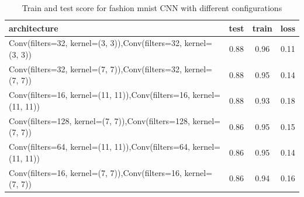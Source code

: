 \documentclass[10pt]{SelfArx} %
\begin{document}
\begin{table}[]
	\begin{tabular*}{1\linewidth}{@{\extracolsep{\fill} }lccc@{}}
		\toprule
		architecture & test & train & loss \\ \midrule
		Conv(filters=32, kernel=(3, 3)),Conv(filters=32, kernel=(3, 3)) & 0.88 & 0.96 & 0.11 \\
		Conv(filters=32, kernel=(7, 7)),Conv(filters=32, kernel=(7, 7)) & 0.88 & 0.95 & 0.14 \\
		Conv(filters=16, kernel=(11, 11)),Conv(filters=16, kernel=(11, 11)) & 0.88 & 0.93 & 0.18 \\
		Conv(filters=128, kernel=(7, 7)),Conv(filters=128, kernel=(7, 7)) & 0.86 & 0.95 & 0.15 \\
		Conv(filters=64, kernel=(11, 11)),Conv(filters=64, kernel=(11, 11)) & 0.86 & 0.95 & 0.14 \\
		Conv(filters=16, kernel=(7, 7)),Conv(filters=16, kernel=(7, 7)) & 0.86 & 0.94 & 0.16 \\ \bottomrule
	\end{tabular*}
	\caption{Train and test score for fashion mnist CNN  with different configurations}
	\label{tfashion2}
\end{table}
\end{document}
